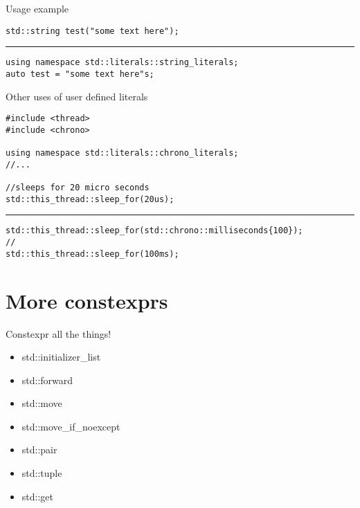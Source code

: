 \documentclass[10pt]{beamer}
\begin{document}
\begin{frame}[fragile]{Usage example}

	\begin{verbatim}
std::string test("some text here");
	\end{verbatim}

	\hrule
	\pause
	\begin{verbatim}
using namespace std::literals::string_literals;
auto test = "some text here"s;
	\end{verbatim}
\end{frame}

\begin{frame}[fragile]{Other uses of user defined literals}

	\begin{verbatim}
#include <thread>
#include <chrono>

using namespace std::literals::chrono_literals;
//...

//sleeps for 20 micro seconds
std::this_thread::sleep_for(20us); 
	\end{verbatim}
\pause
\hrule
\vfill
\begin{verbatim}
std::this_thread::sleep_for(std::chrono::milliseconds{100});
//
std::this_thread::sleep_for(100ms);
\end{verbatim}

\end{frame}

\section{More constexprs}
\begin{frame}{Constexpr all the things!}
	\begin{itemize}[<+- |alert@+>]
		\item std::initializer\_list
		\item std::forward 
		\item std::move
		\item std::move\_if\_noexcept
		\item std::pair
		\item std::tuple
		\item std::get
	\end{itemize}
\end{frame}
\end{document}
